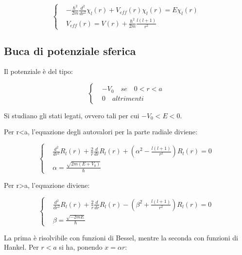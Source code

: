 \documentclass{article}
\begin{document}
\begin{equation}
    \left\{
    \begin{aligned}
         & -\frac{\hbar^2}{2m}\frac{d^2}{dr^2}\chi_l(r)+V_{eff}(r)\chi_l(r)=E\chi_l(r) \\
         & V_{eff}(r)=V(r)+\frac{\hbar^2}{2m}\frac{l(l+1)}{r^2}
    \end{aligned}
    \right.
\end{equation}

\subsection{Buca di potenziale sferica}
Il potenziale è del tipo:

\begin{equation}
    \left\{
    \begin{aligned}
         & -V_0 \quad se \quad 0<r<a \\
         & 0 \quad altrimenti
    \end{aligned}
    \right.
\end{equation}

Si studiano gli stati legati, ovvero tali per cui $-V_0<E<0$.

Per r<a, l'equazione degli autovalori per la parte radiale diviene:

\begin{equation}
    \left\{
    \begin{aligned}
         & \frac{d^2}{dr^2}R_l(r)+\frac{2}{r}\frac{d}{dr}R_l(r)+\left(\alpha^2-\frac{l(l+1)}{r^2}\right)R_l(r)=0 \\
         & \alpha=\frac{\sqrt{2m(E+V_0)}}{\hbar}
    \end{aligned}
    \right.
\end{equation}

Per r>a, l'equazione diviene:

\begin{equation}
    \left\{
    \begin{aligned}
         & \frac{d^2}{dr^2}R_l(r)+\frac{2}{r}\frac{d}{dr}R_l(r)-\left(\beta^2+\frac{l(l+1)}{r^2}\right)R_l(r)=0 \\
         & \beta=\frac{\sqrt{-2mE}}{\hbar}
    \end{aligned}
    \right.
\end{equation}


La prima è risolvibile con funzioni di Bessel, mentre la seconda con funzioni di Hankel.
Per $r<a$ si ha, ponendo $x=\alpha r$:
\end{document}
